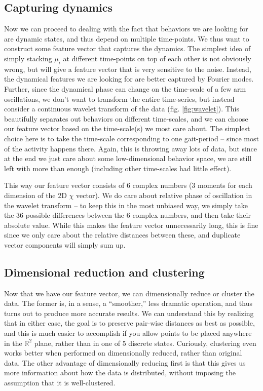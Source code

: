 \documentclass[11pt]{article}
\renewcommand{\=}[1]{\stackrel{#1}{=}} %
\renewcommand{\(}{\left (}
\renewcommand{\)}{\right  )}
\renewcommand{\[}{\left [}
\renewcommand{\]}{\right ]}
\newcommand{\<}{\left <}
\renewcommand{\>}{\right >}
\theoremstyle{definition}
\theoremstyle{remark}
\begin{document}
\subsection{Capturing dynamics}
Now we can proceed to dealing with the fact that behaviors we are looking for are dynamic states, and thus depend on multiple time-points. We thus want to construct some feature vector that captures the dynamics. The simplest idea of simply stacking $ \mu_i $ at different time-points on top of each other is not obviously wrong, but will give a feature vector that is very sensitive to the noise. Instead, the dynamical features we are looking for are better captured by Fourier modes. Further, since the dynamical phase can change on the time-scale of a few arm oscillations, we don't want to transform the entire time-series, but instead consider a continuous wavelet transform of the data (fig. \ref{fig:wavelet}). This beautifully separates out behaviors on different time-scales, and we can choose our feature vector based on the time-scale(s) we most care about. The simplest choice here is to take the time-scale corresponding to one gait-period -- since most of the activity happens there. Again, this is throwing away lots of data, but since at the end we just care about some low-dimensional behavior space, we are still left with more than enough (including other time-scales had little effect). 

This way our feature vector consists of 6 complex numbers (3 moments for each dimension of the 2D $ \chi $ vector). We do care about relative phase of oscillation in the wavelet transform -- to keep this in the most unbiased way, we simply take the 36 possible differences between the 6 complex numbers, and then take their absolute value. While this makes the feature vector unnecessarily long, this is fine since we only care about the relative distances between these, and duplicate vector components will simply sum up.

\subsection{Dimensional reduction and clustering}
Now that we have our feature vector, we can dimensionally reduce or cluster the data. The former is, in a sense, a ``smoother,'' less dramatic operation, and thus turns out to produce more accurate results. We can understand this by realizing that in either case, the goal is to preserve pair-wise distances as best as possible, and this is much easier to accomplish if you allow points to be placed anywhere in the $ \mathbb{R}^2 $ plane, rather than in one of 5 discrete states. Curiously, clustering even works better when performed on dimensionally reduced, rather than original data. The other advantage of dimensionally reducing first is that this gives us more information about how the data is distributed, without imposing the assumption that it is well-clustered. 
\end{document}
